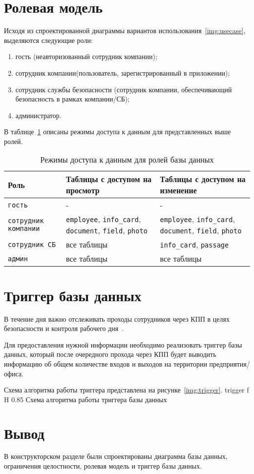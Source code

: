 \section{Ролевая модель}

Исходя из спроектированной диаграммы вариантов использования~\ref{img:usecase}, выделяются следующие роли:
\begin{enumerate}
	\item гость (неавторизованный сотрудник компании);
	\item сотрудник компании(пользователь, зарегистрированный в приложении);
	\item сотрудник службы безопасности (сотрудник компании, обеспечивающий безопасность в рамках компании/СБ);
	\item администратор.
\end{enumerate}

В таблице~\ref{table:roles} описаны режимы доступа к данным для представленных выше ролей.
\begin{table}[!ht]
	\centering
	\caption{\label{table:roles} Режимы доступа к данным для ролей базы данных}
	\begin{tabularx}{\textwidth}{|X|X|X|}
		\hline
		Роль & Таблицы с доступом на просмотр &  Таблицы с доступом на изменение \\ \hline
		\texttt{гость} & - & - \\ \hline
		\texttt{сотрудник компании} & \texttt{employee}, \texttt{info\_card}, \texttt{document}, \texttt{field}, \texttt{photo} & \texttt{employee}, \texttt{info\_card}, \texttt{document}, \texttt{field}, \texttt{photo} \\ \hline
		\texttt{сотрудник СБ} & все таблицы & \texttt{info\_card}, \texttt{passage} \\ \hline
		\texttt{админ} & все таблицы & все таблицы \\ \hline
	\end{tabularx}
\end{table}

\section{Триггер базы данных}

В течение дня важно отслеживать проходы сотрудников через КПП в целях безопасности и контроля рабочего дня~\cite{introCPP}.

Для предоставления нужной информации необходимо реализовать триггер базы данных, который после очередного прохода через КПП будет выводить информацию об общем количестве входов и выходов на территории предприятия/офиса.

Схема алгоритма работы триггера представлена на рисунке~\ref{img:trigger}.
	{trigger}
	{f}
	{H}
	{0.85\textwidth}
	{Схема алгоритма работы триггера базы данных}

\section{Вывод}

В конструкторском разделе были спроектированы диаграмма базы данных, ограничения целостности, ролевая модель и триггер базы данных.
